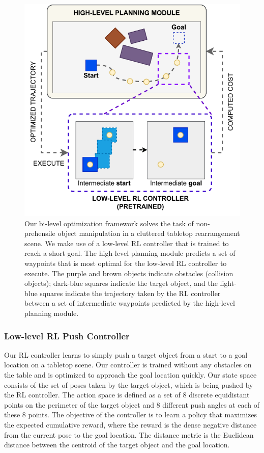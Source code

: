 \begin{figure}
    \centering \includegraphics[scale=0.8]{figures/bl-manipulator/pipeline.v9.pdf} 
    \caption[Bi-level optimization pipeline]{Our bi-level optimization framework solves the task of non-prehensile object manipulation in a cluttered tabletop rearrangement scene. We make use of a low-level RL controller that is trained to reach a short goal. The high-level planning module predicts a set of waypoints that is most optimal for the low-level RL controller to execute. The purple and brown objects indicate obstacles (collision objects); dark-blue squares indicate the target object, and the light-blue squares indicate the trajectory taken by the RL controller between a set of intermediate waypoints predicted by the high-level planning module.}
    \label{fig:pipeline}
\end{figure}

\subsubsection{Low-level RL Push Controller}
\label{sec:low-level-rl}

Our RL controller learns to simply push a target object from a start to a goal location on a tabletop scene. Our controller is trained without any obstacles on the table and is optimized to approach the goal location quickly. Our state space consists of the set of poses taken by the target object, which is being pushed by the RL controller. The action space is defined as a set of 8 discrete equidistant points on the perimeter of the target object and 8 different push angles at each of these 8 points. The objective of the controller is to learn a policy that maximizes the expected cumulative reward, where the reward is the dense negative distance from the current pose to the goal location. The distance metric is the Euclidean distance between the centroid of the target object and the goal location.

